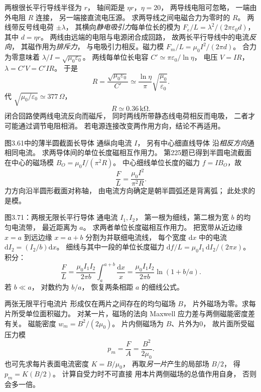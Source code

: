 两根很长平行导线半径为 $r$，
轴间距是 $\eta r$，$\eta=20$，
两导线电阻可忽略，
一端由外电阻 $R$ 连接，
另一端接直流电压源。
求两导线之间电磁合力为零时的 $R$。
\exsolution
两线带反号线电荷 $\pm\lambda$，
其横向\emph{静电吸引力}每单位长的模为
$F_e/L=\lambda^2/(2\pi\varepsilon_0d)$，
其中 $d=\eta r$。
两线由远端的电阻与电源闭合成回路，
故两长平行导线中的电流\emph{反向}，
其磁作用为\emph{排斥力}，
与电吸引力相反。磁力模
$F_m/L=\mu_0I^2/(2\pi d)$。
合力为零意味着
$\lambda/I=\sqrt{\mu_0\varepsilon_0}$。
两线每单位长电容
$C'\simeq\pi\varepsilon_0/\ln\eta$，
电压 $V=IR$，
$\lambda=C'V=C'IR$。
于是
\[
\boxed{R=
\frac{\sqrt{\mu_0\varepsilon_0}}{C'}
\simeq\frac{\ln\eta}{\pi}
\sqrt{\frac{\mu_0}{\varepsilon_0}}}.
\]
代 $\sqrt{\mu_0/\varepsilon_0}
\simeq377\,\Omega$，
\[
\boxed{R\simeq0.36\,\mathrm{k\Omega}}.
\]
\excheck 闭合回路使两线电流反向而磁斥，
同时两线所带静态线电荷相反而电吸，
二者才可能通过调节电阻相消。
若电源连接改变两作用方向，结论不再适用。

图3.61中的薄半圆截面长导体
通纵向电流 $I$，
另有中心细直线导体
沿\emph{相反方向}通相同电流。
求两导体间的单位长度磁相互作用力。
\exsolution
第225题已得到半圆电流截面
在中心的磁场模
$B_O=\mu_0I/(\pi^2R)$。
中心细线单位长度的磁力
$f=I B_O$，故
\[
\boxed{\frac FL=\frac{\mu_0I^2}{\pi^2R}}.
\]
\excheck 力方向沿半圆形截面对称轴，
由电流方向确定是朝半圆弧还是背离弧；
此处求的是模。

图3.71：两根无限长平行导体
通电流 $I_1,I_2$，
第一根为细线，第二根为宽 $b$
的均匀电流带，
最近距离为 $a$。
求两者单位长度磁相互作用力。
\exsolution
把宽带从近边缘 $x=a$
到远边缘 $x=a+b$
分割为并联细电流线，
每个宽度 $\mathrm dx$
中的电流
$\mathrm dI_2=(I_2/b)\mathrm dx$。
细线与其中一段的单位长度磁力
$\mathrm df/L=
\mu_0I_1\,\mathrm dI_2/(2\pi x)$。
积分：
\[
\frac FL=
\frac{\mu_0I_1I_2}{2\pi b}
\int_a^{a+b}\frac{\mathrm dx}{x}
=\boxed{\frac{\mu_0I_1I_2}{2\pi b}
\ln(1+b/a)}.
\]
\excheck 若 $b\ll a$，
对数约为 $b/a$，
恢复两条相距 $a$ 的细线公式。

两张无限平行电流片
形成仅在两片之间存在的均匀磁场 $B$，
片外磁场为零。求每片所受单位面积磁力。
\exsolution
对某一片，磁场的法向 Maxwell
应力差与两侧磁能密度差有关。
磁能密度 $w_m=B^2/(2\mu_0)$。
片内侧磁场为 $B$、片外为0，
故片面所受磁压力模
\[
\boxed{p_m=\frac FA=\frac{B^2}{2\mu_0}}.
\]
也可先求每片表面电流密度
$K=B/\mu_0$，
再取\emph{另一片}产生的局部场 $B/2$，
得 $p_m=K(B/2)$。
\excheck 计算自受力时不可直接
用本片两侧磁场的总值作用自身，
否则会多一倍。

